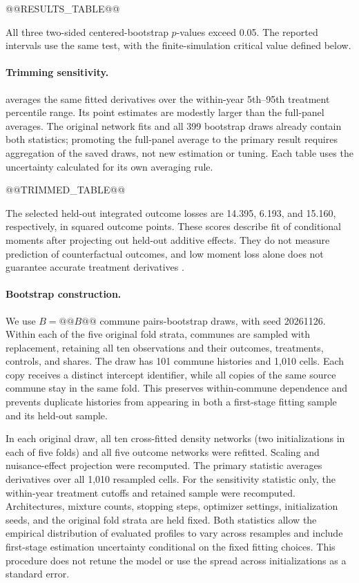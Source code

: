 @@RESULTS_TABLE@@

All three two-sided centered-bootstrap $p$-values exceed 0.05. The reported intervals use the same test, with the finite-simulation critical value defined below.

\paragraph{Trimming sensitivity.}
 averages the same fitted derivatives over the within-year 5th--95th treatment percentile range. Its point estimates are modestly larger than the full-panel averages. The original network fits and all 399 bootstrap draws already contain both statistics; promoting the full-panel average to the primary result requires aggregation of the saved draws, not new estimation or tuning. Each table uses the uncertainty calculated for its own averaging rule.

@@TRIMMED_TABLE@@

The selected held-out integrated outcome losses are 14.395, 6.193, and 15.160, respectively, in squared outcome points. These scores describe fit of conditional moments after projecting out held-out additive effects. They do not measure prediction of counterfactual outcomes, and low moment loss alone does not guarantee accurate treatment derivatives \cite[Section 3.2]{deepiv}.

\paragraph{Bootstrap construction.}
We use $B=@@B@@$ commune pairs-bootstrap draws, with seed 20261126. Within each of the five original fold strata, communes are sampled with replacement, retaining all ten observations and their outcomes, treatments, controls, and shares. The draw has 101 commune histories and 1,010 cells. Each copy receives a distinct intercept identifier, while all copies of the same source commune stay in the same fold. This preserves within-commune dependence and prevents duplicate histories from appearing in both a first-stage fitting sample and its held-out sample.

In each original draw, all ten cross-fitted density networks (two initializations in each of five folds) and all five outcome networks were refitted. Scaling and nuisance-effect projection were recomputed. The primary statistic averages derivatives over all 1,010 resampled cells. For the sensitivity statistic only, the within-year treatment cutoffs and retained sample were recomputed. Architectures, mixture counts, stopping steps, optimizer settings, initialization seeds, and the original fold strata are held fixed. Both statistics allow the empirical distribution of evaluated profiles to vary across resamples and include first-stage estimation uncertainty conditional on the fixed fitting choices. This procedure does not retune the model or use the spread across initializations as a standard error.

